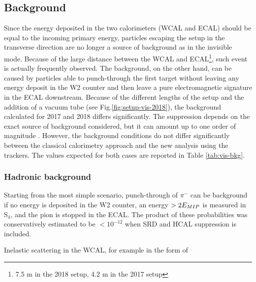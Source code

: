 \subsection{Background}
\label{ch3:sec:bkg:vis}

Since the energy deposited in the two calorimeters (WCAL and ECAL) should be equal to the incoming primary energy, particles escaping the setup in the transverse direction are no longer a source of background as in the invisible mode. Because of the large distance between the WCAL and ECAL\footnote{7.5 \si{\meter} in the 2018 setup, 4.2 \si{\meter} in the 2017 setup}, such event is actually frequently observed. The background, on the other hand, can be caused by particles able to punch-through the first target without leaving any energy deposit in the W2 counter and then leave a pure electromagnetic signature in the ECAL downstream. Because of the different lengths of the setup and the addition of a vacuum tube (see Fig.\ref{fig:setup-vis-2018}), the background calculated for 2017 and 2018 differs significantly. The suppression depends on the exact source of background considered, but it can amount up to one order of magnitude \cite{Banerjee:2019hmi}. However, the background conditions do not differ significantly between the classical calorimetry approach and the new analysis using the trackers. The values expected for both cases are reported in Table \ref{tab:vis-bkg}.


\subsubsection{Hadronic background}
\label{ch3:sec:bkg:vis:hadr}

Starting from the most simple scenario, punch-through of $\pi^-$ can be background if no energy is deposited in the W2 counter, an energy $> 2E_{MIP}$ is measured in S$_4$, and the pion is stopped in the ECAL. The product of these probabilities was conservatively estimated to be $< 10^{-12}$ when SRD and HCAL suppression is included.

Inelastic scattering in the WCAL, for example in the form of

